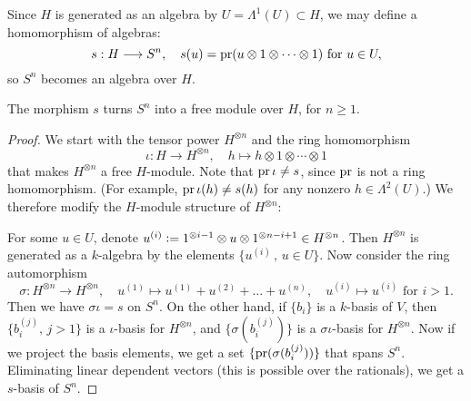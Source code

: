 Since $H$ is generated as an algebra by $U=\Lambda^1(U)\subset H$, we may define a homomorphism of algebras:
$$ s : H \longrightarrow S^n, \quad s(u) = \operatorname{pr}( u \otimes 1\otimes\cdots\otimes 1)\text{ for }u\in U, $$
so $S^n$ becomes an algebra over $H$.
\begin{lemma}
\label{SuperFree}
The morphism $s$ turns $S^n$ into a free module over $H$, for $n\geq 1$.
\end{lemma}
\begin{proof}
We start with the tensor power $H^{\otimes n}$ and the ring homomorphism 
$$
\iota : H \longrightarrow H^{\otimes n},\quad h\longmapsto h\otimes 1\otimes\cdots\otimes 1
$$
that makes $H^{\otimes n}$ a free $H$-module. Note that $\operatorname{pr} \iota \neq s$, since $\operatorname{pr}$ is not a ring homomorphism.
(For example, $\operatorname{pr}\iota(h)\neq s(h)$ for any nonzero $h\in\Lambda^2(U)$.)
We therefore modify the $H$-module structure of $H^{\otimes n}$:

For some $u\in U$, denote $u^{(i)} \vcentcolon=  1^{\otimes i-1}\otimes u\otimes 1^{\otimes n-i+1} \in H^{\otimes n}$. Then $H^{\otimes n}$ is generated as a $k$-algebra by the elements $\{u^{(i)}\,,\,u\in U\}$. Now consider the ring automorphism
$$
\sigma : H^{\otimes n} \longrightarrow H^{\otimes n}, \quad u^{(1)} \longmapsto u^{(1)} +u^{(2)} + \ldots + u^{(n)}, \quad
u^{(i)} \longmapsto u^{(i)} \text{ for } i>1.
$$
Then we have $\sigma\iota = s$ on $S^n$. On the other hand, if $\{b_i\}$ is a $k$-basis of $V$, then $\{b_i^{(j)},\,j>1\} $ is a $\iota$-basis for $H^{\otimes n}$, and $\{\sigma(b_i^{(j)})\}$ is a $\sigma\iota$-basis for $H^{\otimes n}$.
Now if we project the basis elements, we get a set $\{\operatorname{pr}(\sigma(b_i^{(j)}))\}$ that spans $S^n$. Eliminating linear dependent vectors (this is possible over the rationals), we get a $s$-basis of $S^n$.
\end{proof}



